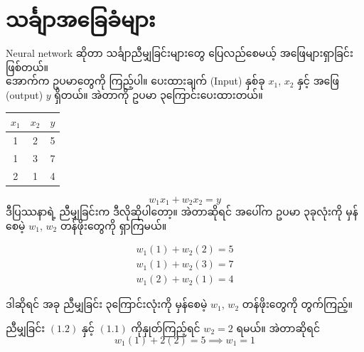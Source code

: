 \chapter{သင်္ချာအခြေခံများ}

Neural network ဆိုတာ သင်္ချာညီမျှခြင်းများတွေ ပြေလည်စေမယ့် အဖြေများရှာခြင်းဖြစ်တယ်။ \\
အောက်က ဥပမာတွေကို ကြည့်ပါ။ ပေးထားချက် (Input) နှစ်ခု $x_1$, $x_2$ နှင့် အဖြေ (output) $y$ ရှိတယ်။ အဲတာကို ဥပမာ ၃ကြောင်းပေးထားတယ်။

\begin{center}
\begin{tabular}{ccc}
\toprule
$x_1$ & $x_2$ & $y$ \\
\midrule
1 & 2 & 5 \\
1 & 3 & 7 \\
2 & 1 & 4 \\
\bottomrule
\end{tabular}
\end{center}

$$
w_1 x_1 + w_2 x_2 = y
$$
ဒီပြဿနာရဲ့ ညီမျှခြင်းက ဒီလိုဆိုပါတော့။ အဲတာဆိုရင် အပေါ်က ဥပမာ ၃ခုလုံးကို မှန်စေမဲ့ $w_1$, $w_2$ တန်ဖိုးတွေကို ရှာကြမယ်။

\begin{align}
w_1 (1) + w_2 (2) = 5 \\
w_1 (1) + w_2 (3) = 7 \\
w_1 (2) + w_2 (1) = 4
\end{align}

\noindent ဒါဆိုရင် အခု ညီမျှခြင်း ၃ကြောင်းလုံးကို မှန်စေမဲ့ $w_1$, $w_2$ တန်ဖိုးတွေကို တွက်ကြည့်။

\noindent ညီမျှခြင်း $(1.2)$ နှင့် $(1.1)$ ကိုနှုတ်ကြည့်ရင် $w_2 = 2$ ရမယ်။ အဲတာဆိုရင် $$ w_1 (1) + 2 (2) = 5 \implies w_1 = 1 $$


